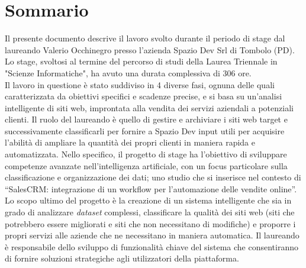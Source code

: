 \cleardoublepage
{}
{}
\begingroup
\let\clearpage\relax
\let\cleardoublepage\relax
\let\cleardoublepage\relax

\chapter*{Sommario}

Il presente documento descrive il lavoro svolto durante il periodo di stage dal laureando
Valerio Occhinegro presso l’azienda Spazio Dev Srl di Tombolo (PD). Lo stage, svoltosi al termine del percorso di studi della Laurea Triennale in "Scienze Informatiche", ha avuto una durata complessiva di 306 ore.\\
Il lavoro in questione è stato suddiviso in 4 diverse fasi, ognuna delle quali caratterizzata da obiettivi specifici e scadenze precise, e si basa su un'analisi intelligente di siti web, improntata alla vendita dei servizi aziendali a potenziali clienti. Il ruolo del laureando è quello di gestire e archiviare i siti web target e successivamente classificarli per fornire a Spazio Dev input utili per acquisire l'abilità di ampliare la quantità dei propri clienti in maniera rapida e automatizzata. 
Nello specifico, il progetto di stage ha l’obiettivo di sviluppare competenze avanzate nell’intelligenza artificiale, con un focus
particolare sulla classificazione e organizzazione dei dati; uno studio che si inserisce nel contesto di
“SalesCRM: integrazione di un workflow per l'automazione delle vendite online”.
Lo scopo ultimo del progetto è la creazione di un sistema intelligente che sia in grado di analizzare \emph{\gls{dataset}} complessi,
classificare la qualità dei siti web (siti che potrebbero essere migliorati e siti che non necessitano di modifiche) e proporre i propri servizi alle aziende che ne necessitano in maniera automatica. 
Il laureando è responsabile dello sviluppo di funzionalità chiave del sistema che consentiranno di fornire
soluzioni strategiche agli utilizzatori della piattaforma. 






\endgroup

\vfill

